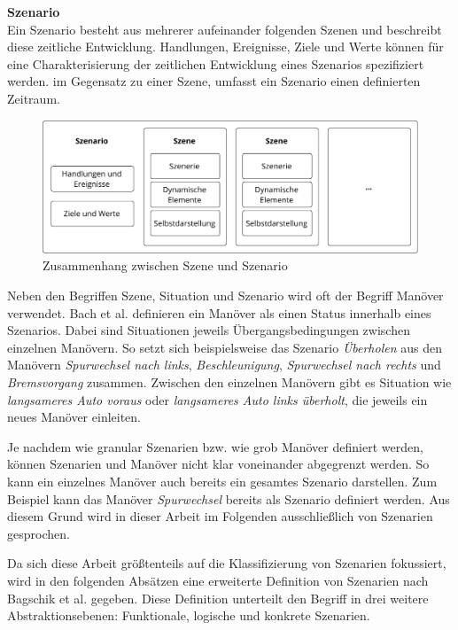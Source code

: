 \noindent\textbf{Szenario}\\
Ein Szenario besteht aus mehrerer aufeinander folgenden Szenen und beschreibt diese zeitliche Entwicklung. Handlungen, Ereignisse, Ziele und Werte können für eine Charakterisierung der zeitlichen Entwicklung eines Szenarios spezifiziert werden. im Gegensatz zu einer Szene, umfasst ein Szenario einen definierten Zeitraum.

\begin{figure}[h]
\centering
\includegraphics[scale=0.7]{images/relation_sc_sc.pdf}
\caption{Zusammenhang zwischen Szene und Szenario \cite{ulbrich2015defining}}
\label{fig_relation_sc_sc}
\end{figure}

Neben den Begriffen Szene, Situation und Szenario wird oft der Begriff Manöver verwendet. Bach et al. \cite{bach2016model} definieren ein Manöver als einen Status innerhalb eines Szenarios. Dabei sind Situationen jeweils Übergangsbedingungen zwischen einzelnen Manövern. So setzt sich beispielsweise das Szenario \textit{Überholen} aus den Manövern \textit{Spurwechsel nach links}, \textit{Beschleunigung}, \textit{Spurwechsel nach rechts} und \textit{Bremsvorgang} zusammen. Zwischen den einzelnen Manövern gibt es Situation wie \textit{langsameres Auto voraus} oder \textit{langsameres Auto links überholt}, die jeweils ein neues Manöver einleiten.

Je nachdem wie granular Szenarien bzw. wie grob Manöver definiert werden, können Szenarien und Manöver nicht klar voneinander abgegrenzt werden. So kann ein einzelnes Manöver auch bereits ein gesamtes Szenario darstellen. Zum Beispiel kann das Manöver \textit{Spurwechsel} bereits als Szenario definiert werden. Aus diesem Grund wird in dieser Arbeit im Folgenden ausschließlich von Szenarien gesprochen.

Da sich diese Arbeit größtenteils auf die Klassifizierung von Szenarien fokussiert, wird in den folgenden Absätzen eine erweiterte Definition von Szenarien nach Bagschik et al. \cite{bagschik2017szenarien} gegeben. Diese Definition unterteilt den Begriff in drei weitere Abstraktionsebenen: Funktionale, logische und konkrete Szenarien.

